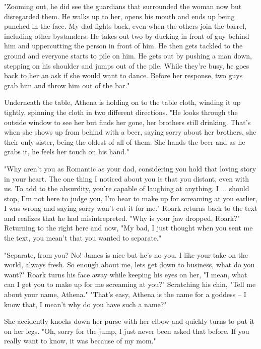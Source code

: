         "Zooming out, he did see the guardians that surrounded the woman now but disregarded them. He walks up to her, opens his mouth and ends
    up being punched in the face. My dad fights back, even when the others join the barrel, including other bystanders. He takes out two by ducking
    in front of guy behind him and uppercutting the person in front of him. He then gets tackled to the ground and everyone starts to pile on
    him. He gets out by pushing a man down, stepping on his shoulder and jumps out of the pile. While they're busy, he goes back to her an ask
    if she would want to dance. Before her response, two guys grab him and throw him out of the bar."

        Underneath the table, Athena is holding on to the table cloth, winding it up tightly, spinning the cloth in two different directions.
    "He looks through the outside window to see her but finds her gone, her brothers still drinking. That's when she shows up from behind with
    a beer, saying sorry about her brothers, she their only sister, being the oldest of all of them. She hands the beer and as he grabs it, he
    feels her touch on his hand."

        "Why aren't you as Romantic as your dad, considering you hold that loving story in your heart. The one thing I noticed about you is that
    you distant, even with us. To add to the absurdity, you're capable of laughing at anything. I ... should stop, I'm not here to judge you,
    I'm hear to make up for screaming at you earlier, I was wrong and saying sorry won't cut it for me." Roark returns back to the text and
    realizes that he had misintrepreted. "Why is your jaw dropped, Roark?" Returning to the right here and now, "My bad, I just thought when
    you sent me the text, you mean't that you wanted to separate."

        "Separate, from you? No! James is nice but he's no you. I like your take on the world, always fresh. So enough about me, lets get down
    to business, what do you want?" Roark turns his face away while keeping his eyes on her, "I mean, what can I get you to make up for me
    screaming at you?" Scratching his chin, "Tell me about your name, Athena." "That's easy, Athena is the name for a goddess -- I know that,
    I mean't why do you have such a name?"

        She accidently knocks down her purse with her elbow and quickly turns to put it on her legs. "Oh, sorry for the jump, I just never been
    asked that before. If you really want to know, it was because of my mom."

